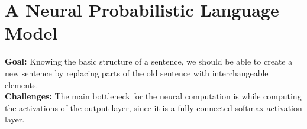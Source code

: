 \documentclass[11pt,a4paper]{article}
\begin{document}


\section{A Neural Probabilistic Language Model} %
\label{sec:a_neural_probabilistic_language_model}

  \textbf{Goal:}
  Knowing the basic structure of a sentence, we should be able to create a new sentence by replacing parts of the old sentence with interchangeable elements.\\

  \textbf{Challenges:}
  The main bottleneck for the neural computation is while computing the activations of the output layer, since it is a fully-connected softmax activation layer. \\
\end{document}
